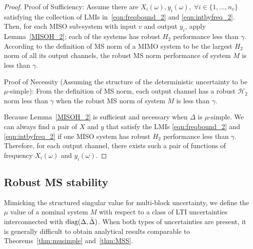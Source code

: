 \begin{proof}
Proof of Sufficiency:
Assume there are $X_i(\omega),y_i(\omega),\; \forall i\in\{1,\hdots,n_v\}$ satisfying the collection of LMIs in~\eqref{eqn:freqbound_2} and \eqref{eqn:intbyfreq_2}.
Then, for each MISO sub-system with input $v$ and output $y_i$, apply Lemma~\ref{MISOH_2}; each of the systems has robust $H_2$ performance less than $\gamma$. According to the definition of MS norm of a MIMO system to be the largest $H_2$ norm of all its output channels, the robust MS norm performance of system $M$ is less than $\gamma$.

Proof of Necessity (Assuming the structure of the deterministic uncertainty to be $\mu$-simple):
From the definition of MS norm, each output channel has a robust $\mathcal{H}_2$ norm less than $\gamma$ when the robust MS norm of system $M$ is less than $\gamma$.

Because Lemma~\ref{MISOH_2} is sufficient and necessary when $\Delta$ is $\mu$-simple. We can always find a pair of $X$ and $y$ that satisfy the LMIs \eqref{eqn:freqbound_2} and \eqref{eqn:intbyfreq_2} if one MISO system has robust $H_2$ performance less than $\gamma$.
Therefore, for each output channel, there exists such a pair of functions of frequency $X_i(\omega)$ and $y_i(\omega)$. 
\end{proof}




\subsection{Robust MS stability}


Mimicking the structured singular value for multi-block uncertainty, we define the $\mu$ value of a nominal system $M$ with respect to a class of LTI uncertainties interconnected with ${\mathrm{diag}}(\Delta,\bar{\Delta})$. When both types of uncertainties are present, it is generally difficult to obtain analytical results comparable to Theorems~\ref{thm:musimple} and~\ref{thm:MSS}. 

